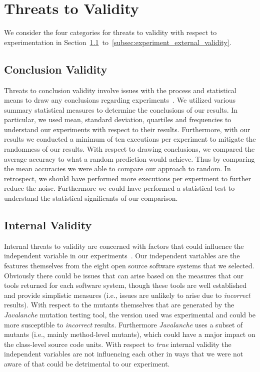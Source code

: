 \section{Threats to Validity}
\label{sec:experiment_threats}
We consider the four categories for threats to validity with respect to experimentation in Section~\ref{subsec:experiment_conclusion_validity}~to~\ref{subsec:experiment_external_validity}.


\subsection{Conclusion Validity}
\label{subsec:experiment_conclusion_validity}
Threats to conclusion validity involve issues with the process and statistical means to draw any conclusions regarding experiments~\cite{WRH+00,WKP10}. We utilized various summary statistical measures to determine the conclusions of our results. In particular, we used mean, standard deviation, quartiles and frequencies to understand our experiments with respect to their results. Furthermore, with our results we conducted a minimum of ten executions per experiment to mitigate the randomness of our results. With respect to drawing conclusions, we compared the average accuracy to what a random prediction would achieve. Thus by comparing the mean accuracies we were able to compare our approach to random. In retrospect, we should have performed more executions per experiment to further reduce the noise. Furthermore we could have performed a statistical test to understand the statistical significants of our comparison.


\subsection{Internal Validity}
\label{subsec:experiment_internal_validity}
Internal threats to validity are concerned with factors that could influence the independent variable in our experiments~\cite{WRH+00,WKP10}. Our independent variables are the features themselves from the eight open source software systems that we selected. Obviously there could be issues that can arise based on the measures that our tools returned for each software system, though these tools are well established and provide simplistic measures (i.e., issues are unlikely to arise due to \emph{incorrect} results). With respect to the mutants themselves that are generated by the \emph{Javalanche} mutation testing tool, the version used was experimental and could be more susceptible to \emph{incorrect} results. Furthermore \emph{Javalanche} uses a subset of mutants (i.e., mainly method-level mutants), which could have a major impact on the class-level source code units. With respect to \emph{true} internal validity the independent variables are not influencing each other in ways that we were not aware of that could be detrimental to our experiment.



